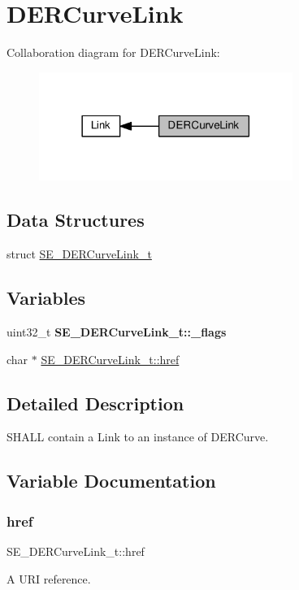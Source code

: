 \hypertarget{group__DERCurveLink}{}\section{D\+E\+R\+Curve\+Link}
\label{group__DERCurveLink}
Collaboration diagram for D\+E\+R\+Curve\+Link\+:\nopagebreak
\begin{figure}[H]
\begin{center}
\leavevmode
\includegraphics[width=234pt]{group__DERCurveLink}
\end{center}
\end{figure}
\subsection*{Data Structures}
\begin{DoxyCompactItemize}
\item 
struct \hyperlink{structSE__DERCurveLink__t}{S\+E\+\_\+\+D\+E\+R\+Curve\+Link\+\_\+t}
\end{DoxyCompactItemize}
\subsection*{Variables}
\begin{DoxyCompactItemize}
\item 
\mbox{\label{group__DERCurveLink_gac55c24937d8107a182e6c17aacf26103}} 
uint32\+\_\+t {\bfseries S\+E\+\_\+\+D\+E\+R\+Curve\+Link\+\_\+t\+::\+\_\+flags}
\item 
char $\ast$ \hyperlink{group__DERCurveLink_ga3f821c7f1cbfabd50649ef5d3f48f446}{S\+E\+\_\+\+D\+E\+R\+Curve\+Link\+\_\+t\+::href}
\end{DoxyCompactItemize}


\subsection{Detailed Description}
S\+H\+A\+LL contain a Link to an instance of D\+E\+R\+Curve. 

\subsection{Variable Documentation}
\mbox{\label{group__DERCurveLink_ga3f821c7f1cbfabd50649ef5d3f48f446}} 
\subsubsection{\texorpdfstring{href}{href}}
{\footnotesize\ttfamily S\+E\+\_\+\+D\+E\+R\+Curve\+Link\+\_\+t\+::href}

A U\+RI reference. 